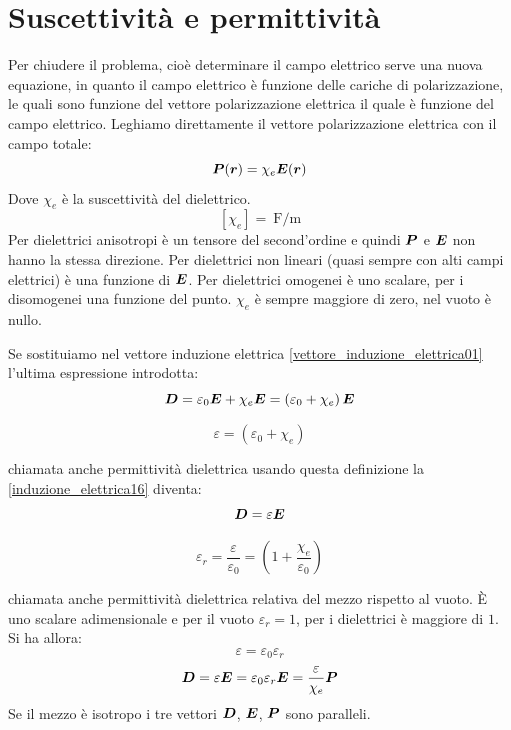 \section{Suscettività e permittività}
Per chiudere il problema, cioè determinare il campo elettrico serve una nuova equazione, in quanto il campo elettrico è funzione delle cariche di polarizzazione, le quali sono funzione del vettore polarizzazione elettrica il quale è funzione del campo elettrico. Leghiamo direttamente il vettore polarizzazione elettrica con il campo totale:
\begin{equation}
  \boldsymbol{P}(\boldsymbol{r})=\chi_e\boldsymbol{E}(\boldsymbol{r})
\end{equation}
Dove $\chi_e$ è la suscettività del dielettrico.
\[
  [\chi_e] = \SI{}{\farad\per\meter}
\]
Per dielettrici anisotropi è un tensore del second'ordine e quindi $\boldsymbol{P}$ e $\boldsymbol{E}$ non hanno la stessa direzione. Per dielettrici non lineari (quasi sempre con alti campi elettrici) è una funzione di $\boldsymbol{E}$. Per dielettrici omogenei è uno scalare, per i disomogenei una funzione del punto. $\chi_e$ è sempre maggiore di zero, nel vuoto è nullo.

Se sostituiamo nel vettore induzione elettrica \eqref{vettore_induzione_elettrica01} l'ultima espressione introdotta:
\begin{equation}
  \boldsymbol{D}=\varepsilon_0\boldsymbol{E}+\chi_e\boldsymbol{E}=\left(\varepsilon_0+\chi_e\right)\boldsymbol{E}
  \label{induzione_elettrica16}
\end{equation}
\begin{Def}
  \begin{equation}
    \varepsilon=\left(\varepsilon_0+\chi_e\right)
  \end{equation}
\end{Def}
chiamata anche permittività dielettrica
usando questa definizione la \eqref{induzione_elettrica16} diventa:
\begin{equation}
  \boldsymbol{D}=\varepsilon\boldsymbol{E}
\end{equation}
\begin{Def}
  \begin{equation}
    \varepsilon_r=\frac{\varepsilon}{\varepsilon_0}=\left(1+\frac{\chi_e}{\varepsilon_0}\right)
  \end{equation}
\end{Def}
chiamata anche permittività dielettrica relativa del mezzo rispetto al vuoto. \`E uno scalare adimensionale e per il vuoto $\varepsilon_r=1$, per i dielettrici è maggiore di $1$. Si ha allora:
\begin{equation}
  \varepsilon=\varepsilon_0\varepsilon_r
\end{equation}
\begin{equation}
  \boldsymbol{D}=\varepsilon\boldsymbol{E}=\varepsilon_0\varepsilon_r\boldsymbol{E}=\frac{\varepsilon}{\chi_e}\boldsymbol{P}
\end{equation}
Se il mezzo è isotropo i tre vettori $\boldsymbol{D}$, $\boldsymbol{E}$, $\boldsymbol{P}$ sono paralleli.

